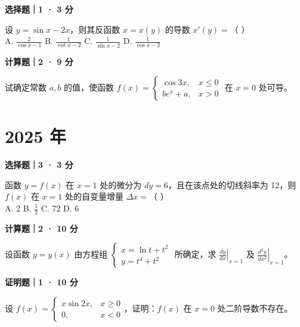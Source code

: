 \textbf{选择题｜1 · 3 分}

设 $y = \sin x - 2x$，则其反函数 $x = x(y)$ 的导数 $x'(y) =$（ \quad ）\\
A. $\frac{2}{\cos x - 1}$ \quad B. $\frac{1}{\cot x - 2}$ \quad C. $\frac{1}{\sin x - 2}$ \quad D. $\frac{1}{\cos x - 2}$


\textbf{计算题｜2 · 9 分}

试确定常数 $a, b$ 的值，使函数 $f(x) = \begin{cases} \cos 3x, & x \le 0 \\ be^x+a, & x > 0 \end{cases}$ 在 $x = 0$ 处可导。


\section*{2025 年}


\textbf{选择题｜3 · 3 分}

函数 $y = f(x)$ 在 $x = 1$ 处的微分为 $dy = 6$，且在该点处的切线斜率为 12，则 $f(x)$ 在 $x = 1$ 处的自变量增量 $\Delta x =$（ \quad ）\\
A. 2 \quad B. $\frac{1}{2}$ \quad C. 72 \quad D. 6


\textbf{计算题｜2 · 10 分}

设函数 $y = y(x)$ 由方程组 $\begin{cases} x = \ln t + t^2 \\ y = t^4 + t^2 \end{cases}$ 所确定，求 $\left. \frac{dy}{dx} \right|_{x=1}$ 及 $\left. \frac{d^2y}{dx^2} \right|_{x=1}$。


\textbf{证明题｜1 · 10 分}

设 $f(x) = \begin{cases} x\sin 2x, & x \ge 0 \\ 0, & x < 0 \end{cases}$，证明：$f(x)$ 在 $x = 0$ 处二阶导数不存在。
